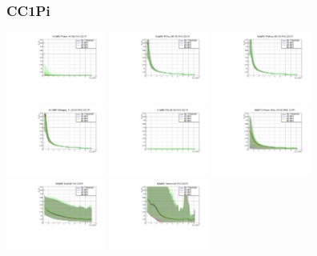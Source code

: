 \subsubsection{CC1Pi}

\begin{center}

  \includegraphics[width=0.245\textwidth]{plots/Elost_profiles/Proton_KE_RHC_CC1Pi.pdf}
  \includegraphics[width=0.245\textwidth]{plots/Elost_profiles/PiPlus_KE_RHC_CC1Pi.pdf}
  \includegraphics[width=0.245\textwidth]{plots/Elost_profiles/PiMinus_KE_RHC_CC1Pi.pdf}
  \includegraphics[width=0.245\textwidth]{plots/Elost_profiles/Charged_Pi_KE_RHC_CC1Pi.pdf}
  \includegraphics[width=0.245\textwidth]{plots/Elost_profiles/Pi0_KE_RHC_CC1Pi.pdf}
  \includegraphics[width=0.245\textwidth]{plots/Elost_profiles/Proton+Pion_KE_RHC_CC1Pi.pdf}
  \includegraphics[width=0.245\textwidth]{plots/Elost_profiles/Total_RHC_CC1Pi.pdf}
  \includegraphics[width=0.245\textwidth]{plots/Elost_profiles/Hadrons_RHC_CC1Pi.pdf}
  
\end{center}

